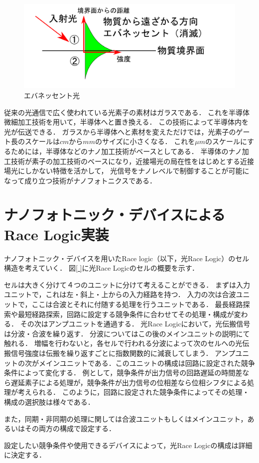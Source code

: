 \begin{figure}[t!]
\begin{center}
\includegraphics[keepaspectratio,scale=0.5]{fig/3/evanesent2.pdf}
\caption{エバネッセント光}
\label{fig:eva2}
\end{center}
\end{figure}
従来の光通信で広く使われている光素子の素材はガラスである．
これを半導体微細加工技術を用いて，半導体へと置き換える．
この技術によって半導体内を光が伝送できる．
ガラスから半導体へと素材を変えただけでは，光素子のゲート長のスケールは$cmからmm$のサイズに小さくなる．
これを$ \mu m$のスケールにするためには，半導体などのナノ加工技術がベースとしてある．
半導体のナノ加工技術が素子の加工技術のベースになり，近接場光の局在性をはじめとする近接場光にしかない特徴を活かして，
光信号をナノレベルで制御することが可能になって成り立つ技術がナノフォトニクスである．
\section{ナノフォトニック・デバイスによるRace Logic実装}
ナノフォトニック・デバイスを用いたRace logic（以下，光Race Logic）のセル構造を考えていく．
図\ref{ }に光Race Logicのセルの概要を示す．

セルは大きく分けて４つのユニットに分けて考えることができる．
まずは入力ユニットで，これは左・斜上・上からの入力経路を持つ．
入力の次は合波ユニットで，ここは合波とそれに付随する処理を行うユニットである．
最長経路探索や最短経路探索，回路に設定する競争条件に合わせてその処理・構成が変わる．
その次はアンプユニットを通過する．
光Race Logicにおいて，光伝搬信号は分波・合波を繰り返す．
分波についてはこの後のメインユニットの説明にて触れる．
増幅を行わないと，各セルで行われる分波によって次のセルへの光伝搬信号強度は伝搬を繰り返すごとに指数関数的に減衰してしまう．
アンプユニットの次がメインユニットである．このユニットの構成は回路に設定された競争条件によって変化する．
例として，競争条件が出力信号の回路遅延の時間差なら遅延素子による処理が，競争条件が出力信号の位相差なら位相シフタによる処理が考えられる．
このように，回路に設定された競争条件によってその処理・構成の選択肢は様々である．

また，同期・非同期の処理に関しては合波ユニットもしくはメインユニット，あるいはその両方の構成で設定する．

設定したい競争条件や使用できるデバイスによって，光Race Logicの構成は詳細に決定する．

